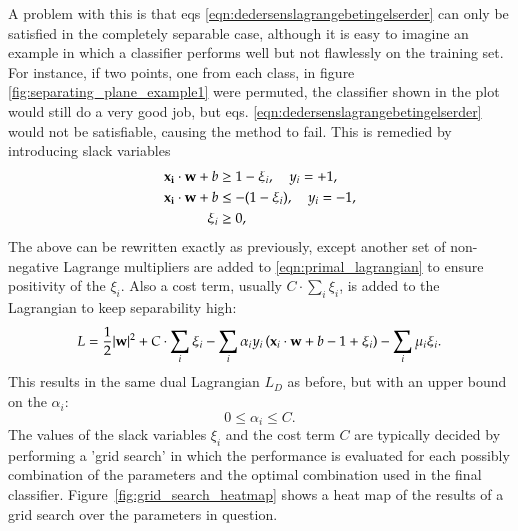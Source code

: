 A problem with this is that eqs \ref{eqn:dedersenslagrangebetingelserder} can only be satisfied in the completely separable case, although it is easy to imagine an example in which a classifier performs well but not flawlessly on the training set. For instance, if two points, one from each class, in figure \ref{fig:separating_plane_example1} were permuted, the classifier shown in the plot would still do a very good job, but eqs. \ref{eqn:dedersenslagrangebetingelserder} would not be satisfiable, causing the method to fail. This is remedied by introducing slack variables
\begin{align}
	\mathbf{x_i}\cdot \mathbf{w} + b &\ge 1 - \xi_i,\quad y_i = +1, \\
	\mathbf{x_i}\cdot \mathbf{w} + b &\le -(1 - \xi_i),\quad y_i = -1, \\
	\xi_i &\ge 0,
\end{align}
The above can be rewritten exactly as previously, except another set of non-negative Lagrange multipliers are added to \eqref{eqn:primal_lagrangian} to ensure positivity of the $\xi_i$. Also a cost term, usually $C\cdot\sum_i\xi_i$, is added to the Lagrangian to keep separability high:
\begin{equation}
	L = \frac{1}{2} |\mathbf{w}|^2 + C\cdot \sum_i\xi_i - \sum_i \alpha_i y_i \left( \mathbf{x}_i\cdot \mathbf{w} + b - 1 + \xi_i \right) - \sum_i\mu_i\xi_i.
\end{equation}
This results in the same dual Lagrangian $L_D$ as before, but with an upper bound on the $\alpha_i$:
\begin{equation}
	0 \le \alpha_i \le C.
\end{equation}
The values of the slack variables $\xi_i$ and the cost term $C$ are typically decided by performing a 'grid search' in which the performance is evaluated for each possibly combination of the parameters and the optimal combination used in the final classifier. Figure~\ref{fig:grid_search_heatmap} shows a heat map of the results of a grid search over the parameters in question.
